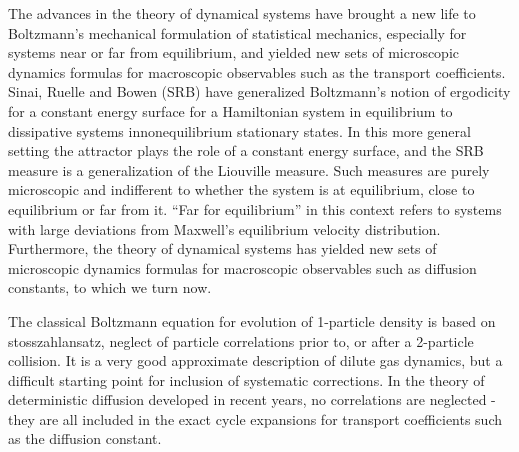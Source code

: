


The advances in the theory of dynamical systems have brought a new life
to Boltzmann's mechanical formulation of statistical mechanics,
especially for systems near or far from equilibrium, and yielded new sets
of microscopic dynamics formulas for macroscopic observables such as the
transport coefficients. Sinai,
Ruelle and Bowen (SRB) have generalized Boltzmann's notion of ergodicity
for a constant energy surface for a Hamiltonian system in equilibrium to
dissipative systems in{nonequilibrium} stationary states. In this more
general setting the attractor plays the role of a constant energy
surface, and the SRB measure is a generalization of the Liouville
measure. Such measures are purely microscopic and indifferent to whether
the system is at equilibrium, close to equilibrium or far from it. ``Far
for equilibrium'' in this context refers to systems with large deviations
from Maxwell's equilibrium velocity distribution. Furthermore, the theory
of dynamical systems has yielded new sets of microscopic dynamics
formulas for macroscopic observables such as diffusion constants, to
which we turn now.

The classical Boltzmann equation for evolution of 1-particle density is
based on stosszahlansatz, neglect of particle correlations prior to, or
after a 2-particle collision. It is a very good approximate description
of dilute gas dynamics, but a difficult starting point for inclusion of
systematic corrections. In the theory of deterministic diffusion
developed in recent years, no correlations are neglected - they are all
included in the exact cycle expansions for transport coefficients such as
the diffusion constant.


%
%


